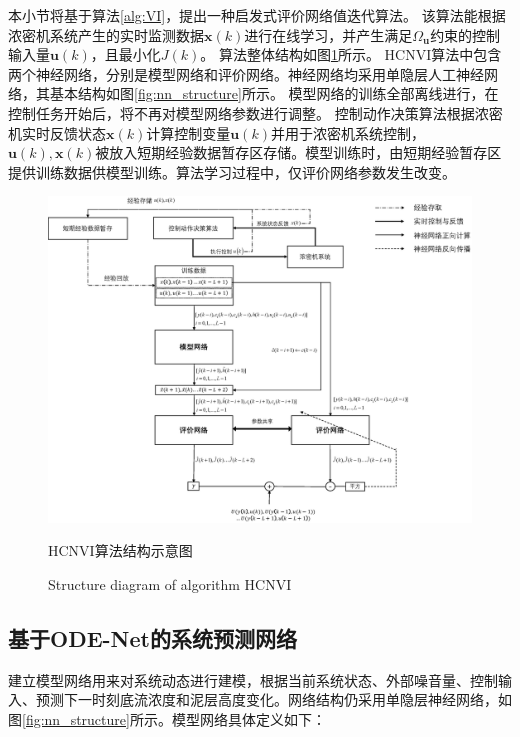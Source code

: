 本小节将基于算法\ref{alg:VI}，提出一种启发式评价网络值迭代算法。
该算法能根据浓密机系统产生的实时监测数据$\pmb
x(k)$进行在线学习，并产生满足$\Omega_{\pmb u}$约束的控制输入量${\pmb
u}(k)$，且最小化$J(k)$。
算法整体结构如图\ref{fig:alg_structure}所示。
HCNVI算法中包含两个神经网络，分别是模型网络和评价网络。神经网络均采用单隐层人工神经网络，其基本结构如图\ref{fig:nn_structure}所示。
模型网络的训练全部离线进行，在控制任务开始后，将不再对模型网络参数进行调整。
控制动作决策算法根据浓密机实时反馈状态$\pmb x(k)$计算控制变量${\pmb
u}(k)$并用于浓密机系统控制，$\pmb u(k),\pmb
x(k)$被放入短期经验数据暂存区存储。模型训练时，由短期经验暂存区提供训练数据供模型训练。算法学习过程中，仅评价网络参数发生改变。
\begin{figure}[!ht]
    \centering
    \includegraphics[width=17cm]{figures/chapter6/fig2.eps}
    \caption{HCNVI算法结构示意图}

  \addtocounter{figure}{-1}
  \vspace{-5pt}
  \renewcommand{\figurename}{Fig.}
  \caption{Structure diagram of algorithm HCNVI}
  \renewcommand{\figurename}{图}

    \label{fig:alg_structure}
\end{figure}
\subsection{基于ODE-Net的系统预测网络}
建立模型网络用来对系统动态进行建模，根据当前系统状态、外部噪音量、控制输入、预测下一时刻底流浓度和泥层高度变化。网络结构仍采用单隐层神经网络，如图\ref{fig:nn_structure}所示。模型网络具体定义如下：



